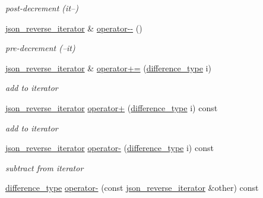 \begin{DoxyCompactItemize}
\begin{DoxyCompactList}\small\item\em post-\/decrement (it--) \end{DoxyCompactList}\item 
\hyperlink{a00080}{json\+\_\+reverse\+\_\+iterator} \& \hyperlink{a00080_a563a7bd281e9919798d18396107fb05c}{operator-\/-\/} ()\hypertarget{a00080_a563a7bd281e9919798d18396107fb05c}{}\label{a00080_a563a7bd281e9919798d18396107fb05c}

\begin{DoxyCompactList}\small\item\em pre-\/decrement (--it) \end{DoxyCompactList}\item 
\hyperlink{a00080}{json\+\_\+reverse\+\_\+iterator} \& \hyperlink{a00080_a9accc9dd9f9033f50c0ab6bcf337ffe0}{operator+=} (\hyperlink{a00025_aec316934a555dd1acdd3600e5d4a4cdf}{difference\+\_\+type} i)\hypertarget{a00080_a9accc9dd9f9033f50c0ab6bcf337ffe0}{}\label{a00080_a9accc9dd9f9033f50c0ab6bcf337ffe0}

\begin{DoxyCompactList}\small\item\em add to iterator \end{DoxyCompactList}\item 
\hyperlink{a00080}{json\+\_\+reverse\+\_\+iterator} \hyperlink{a00080_a99ee137dab7e5c948457f6a5321b54b1}{operator+} (\hyperlink{a00025_aec316934a555dd1acdd3600e5d4a4cdf}{difference\+\_\+type} i) const \hypertarget{a00080_a99ee137dab7e5c948457f6a5321b54b1}{}\label{a00080_a99ee137dab7e5c948457f6a5321b54b1}

\begin{DoxyCompactList}\small\item\em add to iterator \end{DoxyCompactList}\item 
\hyperlink{a00080}{json\+\_\+reverse\+\_\+iterator} \hyperlink{a00080_ac2634bee082633671125e909dffad40a}{operator-\/} (\hyperlink{a00025_aec316934a555dd1acdd3600e5d4a4cdf}{difference\+\_\+type} i) const \hypertarget{a00080_ac2634bee082633671125e909dffad40a}{}\label{a00080_ac2634bee082633671125e909dffad40a}

\begin{DoxyCompactList}\small\item\em subtract from iterator \end{DoxyCompactList}\item 
\hyperlink{a00025_aec316934a555dd1acdd3600e5d4a4cdf}{difference\+\_\+type} \hyperlink{a00080_a115fae3dd8ae02669fedae0545ce1cbc}{operator-\/} (const \hyperlink{a00080}{json\+\_\+reverse\+\_\+iterator} \&other) const \hypertarget{a00080_a115fae3dd8ae02669fedae0545ce1cbc}{}\label{a00080_a115fae3dd8ae02669fedae0545ce1cbc}


\end{DoxyCompactItemize}
